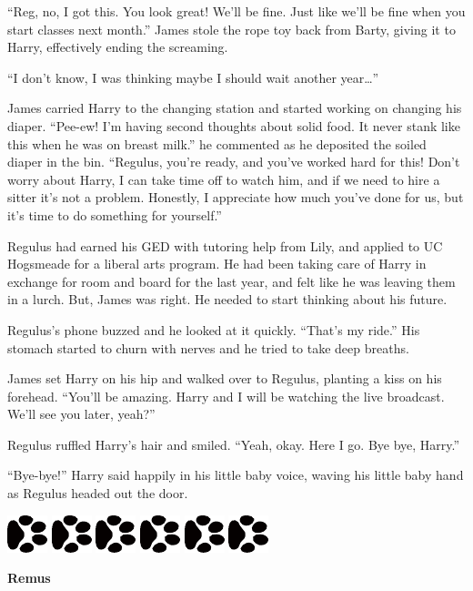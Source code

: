 \documentclass[12pt,twoside,openright]{memoir}
\newcommand{\myrulez}{	
	\begin{center}
		\hspace{.5em}
		\includegraphics[angle=60]{dogprint.pdf}
		\hspace{.5em}
		\includegraphics[angle=120]{dogprint.pdf}
		\hspace{.5em}
		\includegraphics[angle=60]{dogprint.pdf}
		\hspace{.5em}
		\includegraphics[angle=120]{dogprint.pdf}
		\hspace{.5em}
		\includegraphics[angle=60]{dogprint.pdf}
		\hspace{.5em}
		\includegraphics[angle=120]{dogprint.pdf}
		\hspace{.5em}
	\end{center}
}
\begin{document}
``Reg, no, I got this. You look great! We'll be fine. Just like we'll be fine when you start classes next month.'' James stole the rope toy back from Barty, giving it to Harry, effectively ending the screaming. 

``I don't know, I was thinking maybe I should wait another year…''

James carried Harry to the changing station and started working on changing his diaper. ``Pee-ew! I'm having second thoughts about solid food. It never stank like this when he was on breast milk.'' he commented as he deposited the soiled diaper in the bin. ``Regulus, you're ready, and you've worked hard for this! Don't worry about Harry, I can take time off to watch him, and if we need to hire a sitter it's not a problem. Honestly, I appreciate how much you've done for us, but it's time to do something for yourself.''

Regulus had earned his GED with tutoring help from Lily, and applied to UC Hogsmeade for a liberal arts program. He had been taking care of Harry in exchange for room and board for the last year, and felt like he was leaving them in a lurch. But, James was right. He needed to start thinking about his future. 

Regulus's phone buzzed and he looked at it quickly. ``That's my ride.'' His stomach started to churn with nerves and he tried to take deep breaths. 

James set Harry on his hip and walked over to Regulus, planting a kiss on his forehead. ``You'll be amazing. Harry and I will be watching the live broadcast. We'll see you later, yeah?''

Regulus ruffled Harry's hair and smiled. ``Yeah, okay. Here I go. Bye bye, Harry.''

``Bye-bye!'' Harry said happily in his little baby voice, waving his little baby hand as Regulus headed out the door.

\myrulez

\textbf{Remus} 
\end{document}
